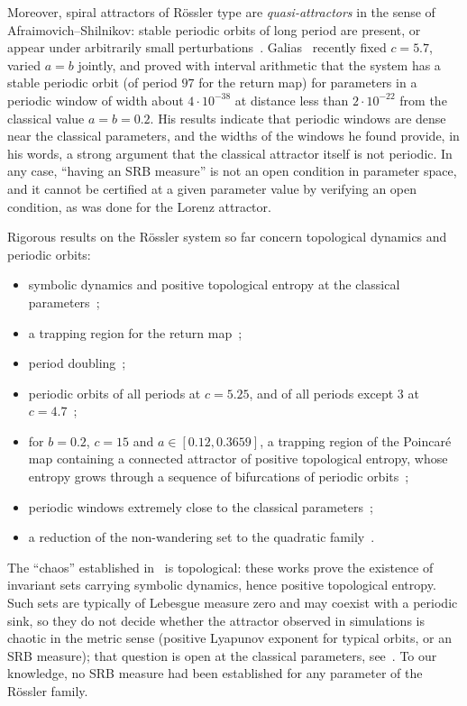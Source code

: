 \documentclass[11pt]{amsart}
\theoremstyle{definition}
\theoremstyle{remark}
\begin{document}
Moreover, spiral attractors of R\"ossler type are \emph{quasi-attractors} in the sense of
Afraimovich--Shilnikov: stable periodic orbits of long period are present, or appear under arbitrarily
small perturbations~\cite{GGKK18}. Galias~\cite{Gal26} recently fixed $c=5.7$, varied $a=b$ jointly, and
proved with interval arithmetic that the system has a stable periodic orbit (of period $97$ for the return
map) for parameters in a periodic window of width about $4\cdot10^{-38}$ at distance less than
$2\cdot10^{-22}$ from the classical value $a=b=0.2$. His results indicate that periodic windows are dense
near the classical parameters, and the widths of the windows he found provide, in his words, a strong
argument that the classical attractor itself is not periodic. In any case, ``having an SRB measure'' is
not an open condition in parameter space, and it cannot be certified at a given parameter value by
verifying an open condition, as was done for the Lorenz attractor.

Rigorous results on the R\"ossler system so far concern topological dynamics and periodic orbits:
\begin{itemize}[leftmargin=*]
\item symbolic dynamics and positive topological entropy at the classical parameters~\cite{Zgl97};
\item a trapping region for the return map~\cite{CAPD21};
\item period doubling~\cite{WZ09pd};
\item periodic orbits of all periods at $c=5.25$, and of all periods except $3$ at $c=4.7$~\cite{GZ21};
\item for $b=0.2$, $c=15$ and $a\in[0.12,0.3659]$, a trapping region of the Poincar\'e map containing a
connected attractor of positive topological entropy, whose entropy grows through a sequence of
bifurcations of periodic orbits~\cite{WSB25};
\item periodic windows extremely close to the classical parameters~\cite{Gal26};
\item a reduction of the non-wandering set to the quadratic family~\cite{Igra23}.
\end{itemize}
The ``chaos'' established in~\cite{Zgl97,WSB25} is topological: these works prove the existence of invariant
sets carrying symbolic dynamics, hence positive topological entropy. Such sets are typically of Lebesgue measure
zero and may coexist with a periodic sink, so they do not decide whether the attractor observed in simulations is
chaotic in the metric sense (positive Lyapunov exponent for typical orbits, or an SRB measure); that question is
open at the classical parameters, see~\cite{Gal26}. To our knowledge, no SRB measure had been established for any
parameter of the R\"ossler family.
\end{document}
